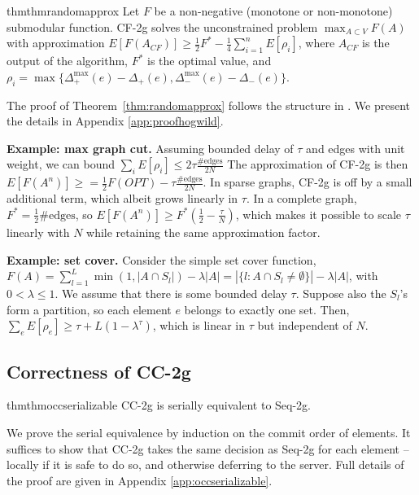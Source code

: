 \documentclass{article} %
\newcommand{\hogwild}{CF-2g}
\newcommand{\occ}{CC-2g}
\newcommand{\seqalg}{Seq-2g}
\newcommand{\hogwildshort}{CF}
\newcommand{\thmref}[1]{Theorem~\ref{#1}}
\begin{document}
\begin{restatable}{thm}{thmrandomapprox}\label{thm:randomapprox} Let $F$ be a non-negative (monotone or non-monotone) submodular function.
\hogwild{} solves the unconstrained problem $\max_{A\subset V} F(A)$ with approximation
$
E[F(A_{\hogwildshort{}})] \geq \frac{1}{2}F^* - \frac{1}{4}\sum_{i=1}^n E[\rho_i]$,
where $A_{\hogwildshort{}}$ is the output of the algorithm, $F^*$ is the optimal value, and $\rho_i = \max\{\Delta_+^{\max}(e) - \Delta_+(e), \Delta_-^{\max}(e) - \Delta_-(e)\}$.
\end{restatable}

The proof of \thmref{thm:randomapprox} follows the structure in \cite{buchbinder2012}. We present the details in Appendix \ref{app:proofhogwild}.



\textbf{Example: max graph cut.}
Assuming bounded delay of $\tau$ and edges with unit weight, we can bound $\sum_i E[\rho_i] \leq 2\tau\frac{\text{\#edges}}{2N}$
The approximation of \hogwild{} is then $E[F(A^n)] \geq = \frac{1}{2} F(OPT) - \tau\frac{\#\text{edges}}{2N}$.
In sparse graphs, \hogwild{} is off by a small additional term, which albeit grows linearly in $\tau$.
In a complete graph, $F^* = \frac{1}{2}\#\text{edges}$, so $E[F(A^n)] \geq F^*\left(\frac{1}{2} - \frac{\tau}{N}\right)$, which makes it possible to scale $\tau$ linearly with $N$ while retaining the same approximation factor.


\textbf{Example: set cover.}
Consider the simple set cover function,
$F(A) = \sum_{l=1}^L \min(1,|A\cap S_l|) - \lambda|A| = |\{l: A\cap S_l \neq\emptyset\}| - \lambda|A|$,
with $0 < \lambda \leq 1$.
We assume that there is some bounded delay $\tau$.
Suppose also the $S_l$'s form a partition, so each element $e$ belongs to exactly one set.
Then, $\sum_e E[\rho_e] \geq \tau + L(1-\lambda^\tau)$, which is linear in $\tau$ but independent of $N$.



\subsection{Correctness of \occ{}}
\begin{restatable}{thm}{thmoccserializable} \occ{} is serially equivalent to \seqalg{}.
\end{restatable}
We prove the serial equivalence by induction on the commit order of elements.
It suffices to show that \occ{} takes the same decision as \seqalg{} for each element -- locally if it is safe to do so, and otherwise deferring to the server.
Full details of the proof are given in Appendix \ref{app:occserializable}.
\end{document}
